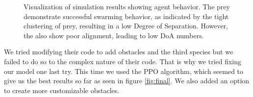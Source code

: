 \documentclass[9pt]{pnas-new}
\begin{document}
\begin{figure}[ht]
\begin{subfigure}{0.30\textwidth}
			\vspace{0.5em}
		\end{subfigure}
		\hfill
		\begin{subfigure}{0.30\textwidth}
			\centering
			\vspace{0.5em}
		\end{subfigure}
		
		\caption{Visualization of simulation results showing agent behavior. The prey demonstrate successful swarming behavior, as indicated by the tight clustering of prey, resulting in a low Degree of Separation. However, the also show poor alignment, leading to low DoA numbers.}
		\label{fig:article}
	\end{figure}
	
	We tried modifying their code to add obstacles and the third species but we failed to do so to the complex nature of their code. That is why we tried fixing our model one last try. This time we used the PPO algorithm, which seemed to give us the best results so far as seen in figure \ref{fig:final}. We also added an option to create more customizable obstacles. 
	
\end{document}
